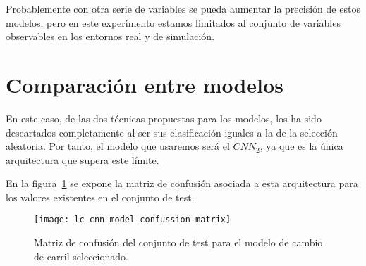 Probablemente con otra serie de variables se pueda aumentar la precisión de estos modelos, pero en este experimento estamos limitados al conjunto de variables observables en los entornos real y de simulación.

\section{Comparación entre modelos}

En este caso, de las dos técnicas propuestas para los modelos, los  ha sido descartados completamente al ser sus clasificación iguales a la de la selección aleatoria. Por tanto, el modelo que usaremos será el $CNN_2$, ya que es la única arquitectura que supera este límite.

En la figura~\ref{fig:lc-cnn-model-confussion-matrix} se expone la matriz de confusión asociada a esta arquitectura para los valores existentes en el conjunto de test.

\begin{figure}
	\centering
	\texttt{[image: lc-cnn-model-confussion-matrix]}
	\caption[Matriz de confusión del conjunto de test para el modelo de cambio de carril seleccionado]{Matriz de confusión del conjunto de test para el modelo de cambio de carril seleccionado.}
	\label{fig:lc-cnn-model-confussion-matrix}
\end{figure}
